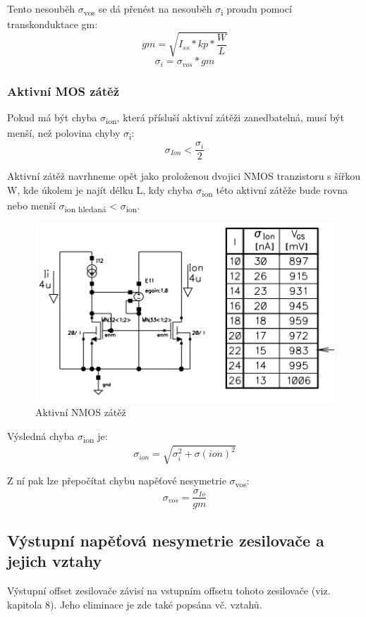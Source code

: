 Tento nesouběh $\sigma$\textsubscript{vos} se dá přenést na nesouběh $\sigma$\textsubscript{i} proudu pomocí transkonduktace gm:
\begin{equation}
gm=\sqrt{I_{ss}*kp*\frac{W}{L}}
\end{equation}
\begin{equation}
\sigma_{i}=\sigma_{vos}*gm
\end{equation}

\subsubsection{Aktivní MOS zátěž}
Pokud má být chyba $\sigma$\textsubscript{ion}, která přísluší aktivní zátěži zanedbatelná, musí být menší, než polovina chyby $\sigma$\textsubscript{i}:
\begin{equation}
\sigma_{Ion} < \frac{\sigma_{i}}{2}
\end{equation}

Aktivní zátěž navrhneme opět jako proloženou dvojici NMOS tranzistoru s šířkou W, kde úkolem je najít délku L, kdy chyba $\sigma$\textsubscript{ion} této aktivní zátěže bude rovna nebo menší $\sigma$\textsubscript{ion hledaná} < $\sigma$\textsubscript{ion}. 
\begin{figure}[h]
   \begin{center}
     \includegraphics[scale=0.6]{images/akt.png}
   \end{center}
   \caption{Aktivní NMOS zátěž}
\end{figure}

Výsledná chyba $\sigma$\textsubscript{ion} je:
\begin{equation}
\sigma_{ion}=\sqrt{\sigma_{i}^2+\sigma(ion)^2}
\end{equation}

Z ní pak lze přepočítat chybu napěťové nesymetrie $\sigma$\textsubscript{vos}:
\begin{equation}
\sigma_{vos}=\frac{\sigma_{Io}}{gm}
\end{equation}

\subsection{Výstupní napěťová nesymetrie zesilovače a jejich vztahy}
Výstupní offset zesilovače závisí na vstupním offsetu tohoto zesilovače (viz. kapitola 8). Jeho eliminace je zde také popsána vč. vztahů.






